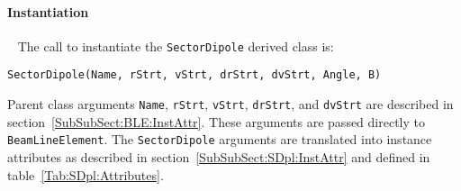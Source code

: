 \paragraph{Instantiation} ~\newline
\noindent
The call to instantiate the \texttt{SectorDipole} derived class is:
\begin{center}
  \texttt{SectorDipole(Name, rStrt, vStrt, drStrt, dvStrt, 
          Angle, B)} 
\end{center}
Parent class arguments \texttt{Name}, \texttt{rStrt}, \texttt{vStrt},
\texttt{drStrt}, and \texttt{dvStrt} are described in
section~\ref{SubSubSect:BLE:InstAttr}.
These arguments are passed directly to \texttt{BeamLineElement}.
The \texttt{SectorDipole} arguments are translated into instance
attributes as described in section~\ref{SubSubSect:SDpl:InstAttr} and
defined in table~\ref{Tab:SDpl:Attributes}.

